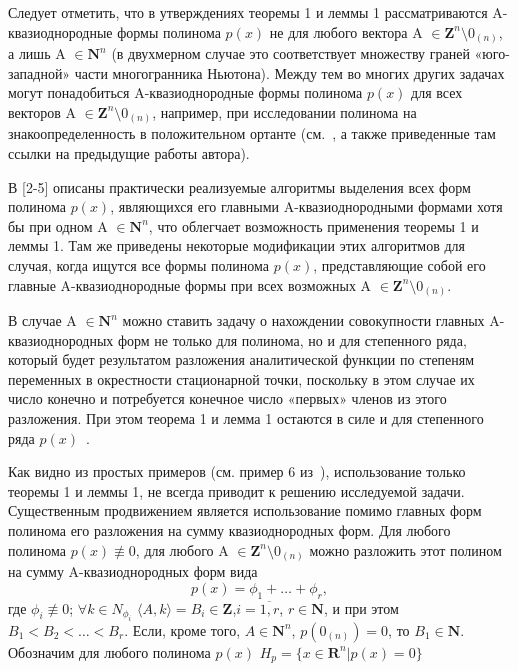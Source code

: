 \renewcommand*{\proof}{\textbf{Доказательство.}}
\newtheorem{statement}{Утверждение}




\begin{remark} {Следует отметить, что в утверждениях теоремы 1 и леммы 1 рассматриваются A-квазиоднородные формы полинома $p(x)$  не для любого вектора A $\in \mathbf{Z}^n\setminus {0_{(n)}}$, а лишь A $\in \mathbf{N}^n$ (в двухмерном случае это соответствует множеству граней «юго-западной» части многогранника Ньютона). Между тем во многих других задачах могут понадобиться  A-квазиоднородные формы полинома $p(x)$ для всех векторов A $\in \mathbf{Z}^n\setminus {0_{(n)}}$,  например, при исследовании полинома на знакоопределенность в положительном ортанте (см.~\cite{nef:11}, а также приведенные там ссылки на предыдущие работы автора).}
\end{remark}
\begin{remark} {В [2-5] описаны практически реализуемые алгоритмы выделения всех форм полинома $p(x)$, являющихся его главными  A-квазиоднородными формами хотя бы при одном A $\in \mathbf{N}^n$, что облегчает возможность применения теоремы 1 и леммы 1. Там же приведены некоторые модификации этих алгоритмов для случая, когда ищутся все формы полинома $p(x)$, представляющие собой его главные  A-квазиоднородные формы при всех возможных A $\in  \mathbf{Z}^n\setminus {0_{(n)}}$.}
\end{remark}
\begin{remark}{В случае A $\in \mathbf{N}^n$ можно ставить задачу о нахождении совокупности главных  A-квазиоднородных форм не только для полинома, но и для степенного ряда, который будет результатом разложения аналитической функции по степеням переменных в окрестности стационарной точки, поскольку в этом случае их число конечно и потребуется конечное число «первых» членов из этого разложения. При этом теорема 1 и лемма 1 остаются в силе и для степенного ряда $p(x)$~\cite{nef:6}.}
\end{remark}

Как видно из простых примеров (см. пример 6 из~\cite{nef:3}), использование только теоремы 1 и леммы 1, не всегда приводит к решению исследуемой задачи. Существенным продвижением является использование помимо главных форм полинома его разложения на сумму квазиоднородных форм. Для любого полинома $p(x)\not\equiv 0$, для любого A $\in \mathbf{Z}^n\setminus {0_{(n)}}$ можно разложить этот полином на сумму A-квазиоднородных форм вида \begin{equation}\label{nef:eq:1} {p(x) = \phi_1 +\dots+\phi_r,} \end{equation} где $\phi_i\not\equiv0$; $\forall k \in N_{\phi_i}$ $\langle A,k\rangle = B_{i}\in\mathbf{Z}$,$i=\overline{1,r}$, $r \in \mathbf{N}$, и при этом $B_1 < B_2 < \dots < B_r$. Если, кроме того, $A \in \mathbf{N}^n$, $p(0_{(n)})= 0$, то $B_1 \in \mathbf{N}$. Обозначим для любого полинома $p(x)$ $H_p = \{x \in \mathbf{R}^n|p(x) = 0\} $

